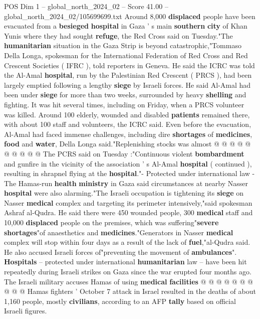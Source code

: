 \begin{textsample}{POS Dim 1 – global\_north\_2024\_02 – Score 41.00 – global\_north\_2024\_02/105699699.txt}  \label{ex:f1_pos_100}
Around 8,000 \textbf{displaced} people have been evacuated from a \textbf{besieged} \textbf{hospital} in Gaza ' s main \textbf{southern} \textbf{city} of Khan Yunis where they had sought \textbf{refuge}, the Red Cross said on Tuesday."The \textbf{humanitarian} situation in the Gaza Strip is beyond catastrophic,"Tommaso Della Longa, spokesman for the International Federation of Red Cross and Red Crescent Societies ( IFRC ), told reporters in Geneva.
He said the ICRC was told the Al-Amal \textbf{hospital}, run by the Palestinian Red Crescent ( PRCS ), had been largely emptied following a lengthy \textbf{siege} by Israeli forces.
He said Al-Amal had been under \textbf{siege} for more than two weeks, surrounded by heavy \textbf{shelling} and fighting.
It was hit several times, including on Friday, when a PRCS volunteer was killed.
Around 100 elderly, wounded and disabled \textbf{patients} remained there, with about 100 staff and volunteers, the ICRC said.
Even before the evacuation, Al-Amal had faced immense challenges, including dire \textbf{shortages} of \textbf{medicines}, \textbf{food} and \textbf{water}, Della Longa said."Replenishing stocks was almost @ @ @ @ @ @ @ @ @ @ The PCRS said on Tuesday :"Continuous violent \textbf{bombardment} and gunfire in the vicinity of the association ' s Al-Amal \textbf{hospital} ( continued ), resulting in shrapnel flying at the \textbf{hospital}."- Protected under international law - The Hamas-run \textbf{health} \textbf{ministry} in Gaza said circumstances at nearby Nasser \textbf{hospital} were also alarming."The Israeli occupation is tightening its \textbf{siege} on Nasser \textbf{medical} complex and targeting its perimeter intensively,"said spokesman Ashraf al-Qudra.
He said there were 450 wounded people, 300 \textbf{medical} staff and 10,000 \textbf{displaced} people on the premises, which was suffering"\textbf{severe} \textbf{shortages}"of anaesthetics and \textbf{medicines}."Generators in Nasser \textbf{medical} complex will stop within four days as a result of the lack of \textbf{fuel},"al-Qudra said.
He also accused Israeli forces of"preventing the movement of \textbf{ambulances}". \textbf{Hospitals} -- protected under international \textbf{humanitarian} law -- have been hit repeatedly during Israeli strikes on Gaza since the war erupted four months ago.
The Israeli military accuses Hamas of using \textbf{medical} \textbf{facilities} @ @ @ @ @ @ @ @ @ @ Hamas fighters ' October 7 attack in Israel resulted in the deaths of about 1,160 people, mostly \textbf{civilians}, according to an AFP \textbf{tally} based on official Israeli figures.

\end{textsample}
